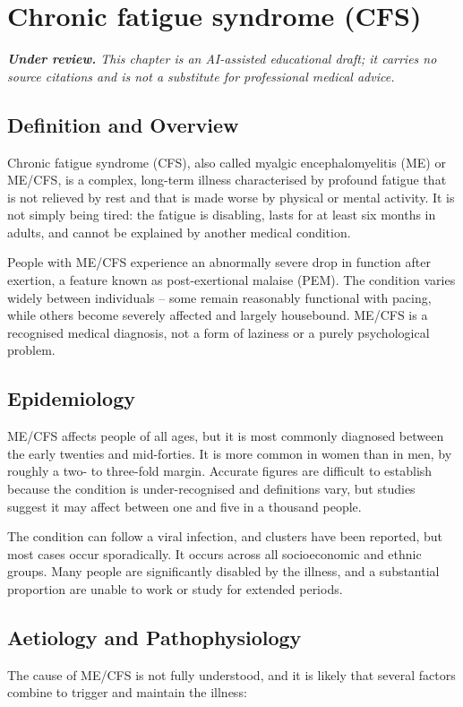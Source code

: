 \chapter{Chronic fatigue syndrome (CFS)}

\medskip
\noindent\textit{\textbf{Under review.} This chapter is an AI-assisted educational draft; it carries no source citations and is not a substitute for professional medical advice.}

\section*{Definition and Overview}
Chronic fatigue syndrome (CFS), also called myalgic encephalomyelitis (ME) or ME/CFS, is a complex, long-term illness characterised by profound fatigue that is not relieved by rest and that is made worse by physical or mental activity. It is not simply being tired: the fatigue is disabling, lasts for at least six months in adults, and cannot be explained by another medical condition.

People with ME/CFS experience an abnormally severe drop in function after exertion, a feature known as post-exertional malaise (PEM). The condition varies widely between individuals -- some remain reasonably functional with pacing, while others become severely affected and largely housebound. ME/CFS is a recognised medical diagnosis, not a form of laziness or a purely psychological problem.

\section*{Epidemiology}
ME/CFS affects people of all ages, but it is most commonly diagnosed between the early twenties and mid-forties. It is more common in women than in men, by roughly a two- to three-fold margin. Accurate figures are difficult to establish because the condition is under-recognised and definitions vary, but studies suggest it may affect between one and five in a thousand people.

The condition can follow a viral infection, and clusters have been reported, but most cases occur sporadically. It occurs across all socioeconomic and ethnic groups. Many people are significantly disabled by the illness, and a substantial proportion are unable to work or study for extended periods.

\section*{Aetiology and Pathophysiology}
The cause of ME/CFS is not fully understood, and it is likely that several factors combine to trigger and maintain the illness:

